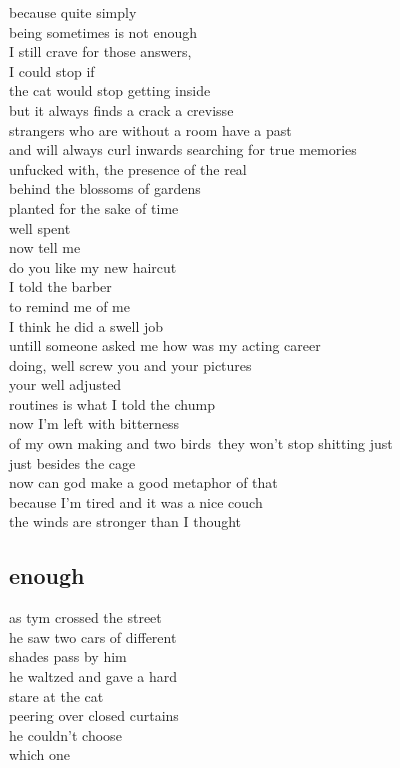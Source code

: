 \documentclass{article}
\begin{document}
because quite simply\\
being sometimes is not enough\\
I still crave for those answers, \\
I could stop if\\
the cat would stop getting inside\\
but it always finds a crack a crevisse\\
strangers who are without a room have a past\\
and will always curl inwards searching for true memories\\
unfucked with, the presence of the real\\
behind the blossoms of gardens\\
planted for the sake of time\\
well spent\\

now tell me\\
do you like my new haircut\\
I told the barber\\
to remind me of me\\
I think he did a swell job\\
untill someone asked me how was my acting career\\
doing, well screw you and your pictures\\
your  well adjusted\\
routines is what I told the chump\\
now I'm left with bitterness\\
of my own making and two birds\
they won't stop shitting just\\
just besides the cage\\
now can god make a good metaphor of that\\
because I'm tired and it was a nice couch\\
the winds are stronger than I thought
\clearpage


\subsection{enough}

as tym crossed the street\\
he saw two cars of different\\
shades pass by him\\
he waltzed and gave a hard\\
stare at the cat\\
peering over closed curtains\\
he couldn't choose\\
which one \\
\end{document}

